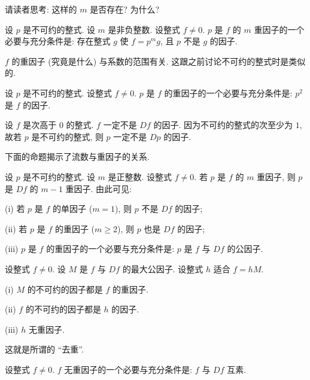 \begin{remark}
    请读者思考: 这样的 $m$ 是否存在? 为什么?
\end{remark}

\begin{proposition}
    设 $p$ 是不可约的整式. 设 $m$ 是非负整数. 设整式 $f \neq 0$. $p$ 是 $f$ 的 $m$ 重因子的一个必要与充分条件是: 存在整式 $g$ 使 $f = p^m g$, 且 $p$ 不是 $g$ 的因子.
\end{proposition}

\begin{remark}
    $f$ 的重因子 (究竟是什么) 与系数的范围有关. 这跟之前讨论不可约的整式时是类似的.
\end{remark}

\begin{proposition}
    设 $p$ 是不可约的整式. 设整式 $f \neq 0$. $p$ 是 $f$ 的重因子的一个必要与充分条件是: $p^2$ 是 $f$ 的因子.
\end{proposition}

\begin{proposition}
    设 $f$ 是次高于 $0$ 的整式. $f$ 一定不是 $Df$ 的因子. 因为不可约的整式的次至少为 $1$, 故若 $p$ 是不可约的整式, 则 $p$ 一定不是 $Dp$ 的因子.
\end{proposition}

下面的命题揭示了流数与重因子的关系.

\begin{proposition}
    设 $p$ 是不可约的整式. 设 $m$ 是正整数. 设整式 $f \neq 0$. 若 $p$ 是 $f$ 的 $m$ 重因子, 则 $p$ 是 $Df$ 的 $m-1$ 重因子. 由此可见:

    (i) 若 $p$ 是 $f$ 的单因子 ($m = 1$), 则 $p$ 不是 $Df$ 的因子;

    (ii) 若 $p$ 是 $f$ 的重因子 ($m \geq 2$), 则 $p$ 也是 $Df$ 的因子;

    (iii) $p$ 是 $f$ 的重因子的一个必要与充分条件是: $p$ 是 $f$ 与 $Df$ 的公因子.
\end{proposition}

\begin{proposition}
    设整式 $f \neq 0$. 设 $M$ 是 $f$ 与 $Df$ 的最大公因子. 设整式 $h$ 适合 $f = hM$.

    (i) $M$ 的不可约的因子都是 $f$ 的重因子.

    (ii) $f$ 的不可约的因子都是 $h$ 的因子.

    (iii) $h$ 无重因子.

    这就是所谓的 ``去重''.
\end{proposition}

\begin{proposition}
    设整式 $f \neq 0$. $f$ 无重因子的一个必要与充分条件是: $f$ 与 $Df$ 互素.
\end{proposition}

